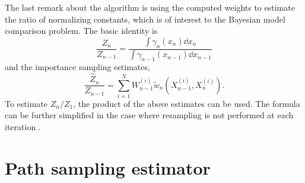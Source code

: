 The last remark about the \smc algorithm is using the computed weights to
estimate the ratio of normalizing constants, which is of interest to the
Bayesian model comparison problem. The basic identity is
\begin{equation}
  \frac{Z_n}{Z_{n-1}} =
  \frac{\int\gamma_n(x_n)\dd x_n}{\int\gamma_{n-1}(x_{n-1})\dd x_{n-1}}
\end{equation}
and the importance sampling estimates,
\begin{equation}
  \frac{\hat{Z}_n}{Z_{n-1}} =
  \sum_{i=1}^NW_{n-1}^{(i)}\tilde{w}_n(X_{n-1}^{(i)},X_n^{(i)}).
  \label{eq:z_smc}
\end{equation}
To estimate $Z_n/Z_1$, the product of the above estimates can be used. The
formula can be further simplified in the case where resampling is not
performed at each iteration \parencite{DelMoral2006}.

\section{Path sampling estimator}
\label{sec:Path sampling estimator}

